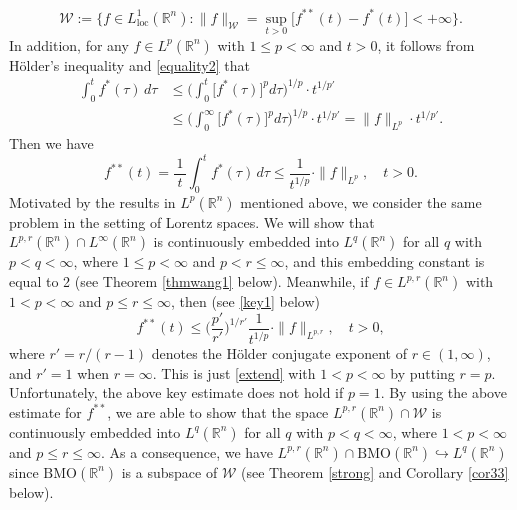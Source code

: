 \documentclass{birkjour}
\theoremstyle{definition}
\theoremstyle{remark}
\numberwithin{equation}{section}
\begin{document}
\begin{equation*}
\mathcal{W}:=\Big\{f\in L^1_{\mathrm{loc}}(\mathbb R^n):\|f\|_{\mathcal{W}}=\sup_{t>0}\big[f^{**}(t)-f^{*}(t)\big]<+\infty\Big\}.
\end{equation*}
In addition, for any $f\in L^p(\mathbb R^n)$ with $1\leq p<\infty$ and $t>0$, it follows from H\"{o}lder's inequality and \eqref{equality2} that
\begin{equation*}
\begin{split}
\int_0^{t}f^{*}(\tau)\,d\tau&\leq\bigg(\int_0^{t}\big[f^{*}(\tau)\big]^pd\tau\bigg)^{1/p}\cdot t^{1/{p'}}\\
&\leq\bigg(\int_0^{\infty}\big[f^{*}(\tau)\big]^pd\tau\bigg)^{1/p}\cdot t^{1/{p'}}=\|f\|_{L^p}\cdot t^{1/{p'}}.
\end{split}
\end{equation*}
Then we have
\begin{equation}\label{extend}
f^{**}(t)=\frac{\,1\,}{t}\int_0^{t}f^{*}(\tau)\,d\tau\leq\frac{1}{t^{1/p}}\cdot\|f\|_{L^p},\quad t>0.
\end{equation}
Motivated by the results in $L^p(\mathbb R^n)$ mentioned above, we consider the same problem in the setting of Lorentz spaces. We will show that $L^{p,r}(\mathbb R^n)\cap L^\infty(\mathbb R^n)$ is continuously embedded into $L^q(\mathbb R^n)$ for all $q$ with $p<q<\infty$, where $1\leq p<\infty$ and $p<r\leq\infty$, and this embedding constant is equal to 2 (see Theorem \ref{thmwang1} below). Meanwhile, if $f\in L^{p,r}(\mathbb R^n)$ with $1<p<\infty$ and $p\leq r\leq\infty$, then (see \eqref{key1} below)
\begin{equation*}
f^{**}(t)\leq\Big(\frac{p'}{r'}\Big)^{1/{r'}}
\frac{1}{t^{1/p}}\cdot\|f\|_{L^{p,r}},\quad t>0,
\end{equation*}
where $r'=r/{(r-1)}$ denotes the H\"{o}lder conjugate exponent of $r\in(1,\infty)$, and $r'=1$ when $r=\infty$. This is just \eqref{extend} with $1<p<\infty$ by putting $r=p$. Unfortunately, the above key estimate does not hold if $p=1$. By using the above estimate for $f^{**}$, we are able to show that the space $L^{p,r}(\mathbb R^n)\cap \mathcal{W}$ is continuously embedded into $L^q(\mathbb R^n)$ for all $q$ with $p<q<\infty$, where $1<p<\infty$ and $p\leq r\leq\infty$. As a consequence, we have $L^{p,r}(\mathbb R^n)\cap \mathrm{BMO}(\mathbb R^n)\hookrightarrow L^q(\mathbb R^n)$ since $\mathrm{BMO}(\mathbb R^n)$ is a subspace of $\mathcal{W}$ (see Theorem \ref{strong} and Corollary \ref{cor33} below).
\end{document}
